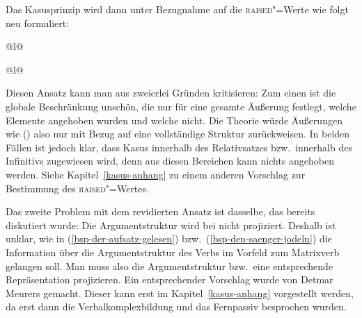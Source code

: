 Das Kasusprinzip wird dann unter Bezugnahme auf die \textsc{raised}"=Werte wie folgt neu formuliert:
\eal
\label{case-prz-zwei}
\ex \begin{tabular}[t]{@{}l@{}}
     \impl \\
    \mbox{}\hspace{3cm}
    \end{tabular}
\ex \begin{tabular}[t]{@{}l@{}}
     \impl \\
    \mbox{}\hspace{3cm}
    \end{tabular}
\zl
Diesen Ansatz kann man aus zweierlei Gründen kritisieren: Zum einen ist die globale Beschränkung
unschön, die nur für eine gesamte Äußerung festlegt, welche Elemente angehoben wurden und welche nicht.
Die Theorie würde Äußerungen wie () also nur mit Bezug auf eine vollständige Struktur zurückweisen.
\eal
{}
\zl
In beiden Fällen ist jedoch klar, dass Kasus innerhalb des Relativsatzes bzw.\
innerhalb des Infinitivs zugewiesen wird, denn aus diesen Bereichen kann nichts angehoben werden. 
Siehe Kapitel~\ref{kasus-anhang} zu einem anderen Vorschlag zur Bestimmung des \textsc{raised}"=Wertes.

Das zweite Problem mit dem revidierten Ansatz ist dasselbe, das bereits diskutiert
wurde: Die Argumentstruktur wird bei \prz nicht projiziert. Deshalb ist
unklar, wie in (\ref{bsp-der-aufsatz-gelesen}) bzw.\ (\ref{bsp-den-saenger-jodeln})
die Information über die Argumentstruktur des Verbs im Vorfeld zum
Matrixverb gelangen soll. Man muss also die Argumentstruktur bzw.\ eine entsprechende
Repräsentation projizieren. Ein entsprechender Vorschlag wurde von Detmar Meurers gemacht.
Dieser kann erst im Kapitel~\ref{kasus-anhang} vorgestellt werden, da erst dann 
die Verbalkomplexbildung und das Fernpassiv besprochen wurden.




